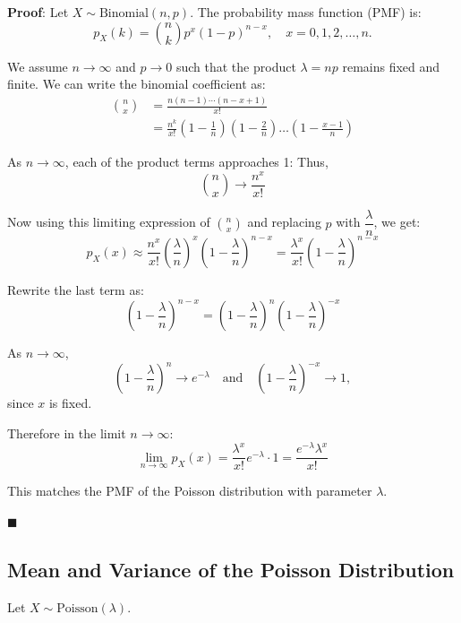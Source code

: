 \documentclass[twoside]{book}
\begin{document}
\textbf{Proof}: Let \( X \sim \text{Binomial}(n, p) \). The probability mass function (PMF) is:
\[
p_X(k) = \binom{n}{k} p^x (1 - p)^{n-x}, \quad x = 0, 1, 2, \ldots, n.
\]

We assume \( n \to \infty \) and \( p \to 0 \) such that the product \( \lambda = np \) remains fixed and finite. We can write the binomial coefficient as:
\begin{align*}
    \binom{n}{x} &= \frac{n (n-1) \cdots (n-x+1)}{x!} \\
    &= \frac{n^k}{x!} \left(1 - \frac{1}{n}\right)\left(1 - \frac{2}{n}\right) \dots \left(1 - \frac{x-1}{n}\right)
\end{align*}

As \( n \to \infty \), each of the product terms approaches 1:
Thus,
\[
\binom{n}{x} \to \frac{n^x}{x!}
\]

Now using this limiting expression of $\binom{n}{x}$ and replacing \( p \) with \( \dfrac{\lambda}{n} \), we get:
\[
p_X(x) \approx \frac{n^x}{x!} \left(\frac{\lambda}{n}\right)^x \left(1 - \frac{\lambda}{n}\right)^{n-x} = \frac{\lambda^x}{x!} \left(1 - \frac{\lambda}{n}\right)^{n-x}
\]

Rewrite the last term as:
\[
\left(1 - \frac{\lambda}{n}\right)^{n-x} = \left(1 - \frac{\lambda}{n}\right)^n \left(1 - \frac{\lambda}{n}\right)^{-x}
\]

As \( n \to \infty \),
\[
\left(1 - \frac{\lambda}{n}\right)^n \to e^{-\lambda}
\quad \text{and} \quad
\left(1 - \frac{\lambda}{n}\right)^{-x} \to 1,
\]
since \( x \) is fixed.


Therefore in the limit \( n \to \infty \):
\[
\lim_{n \to \infty} p_X(x) = \frac{\lambda^x}{x!} e^{-\lambda} \cdot 1 = \frac{e^{-\lambda} \lambda^x}{x!}
\]

This matches the PMF of the Poisson distribution with parameter \( \lambda \).

\hfill\(\blacksquare\)

\subsection{Mean and Variance of the Poisson Distribution}

Let $X \sim \text{Poisson}(\lambda)$.
\end{document}
